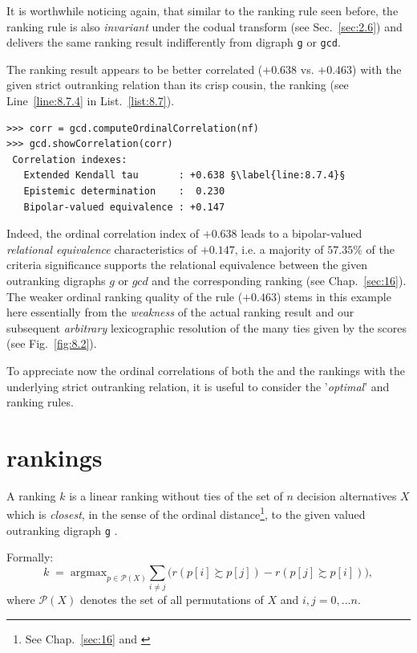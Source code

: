 It is worthwhile noticing again, that similar to the \Copeland ranking rule seen before, the \NetFlows ranking rule is also \emph{invariant} under the codual transform (see Sec.~\ref{sec:2.6}) and delivers the same ranking result indifferently from digraph \texttt{g} or \texttt{gcd}. 

The \NetFlows ranking result appears to be better correlated ($+0.638$ vs. $+0.463$) with the given strict outranking relation than its crisp cousin, the \Copeland ranking (see Line~\ref{line:8.7.4} in List.~\vref{list:8.7}).
\begin{lstlisting}[caption={Checking the quality of the \NetFlows Ranking},label=list:8.7]   
>>> corr = gcd.computeOrdinalCorrelation(nf)
>>> gcd.showCorrelation(corr)
 Correlation indexes:
   Extended Kendall tau       : +0.638 §\label{line:8.7.4}§
   Epistemic determination    :  0.230
   Bipolar-valued equivalence : +0.147
\end{lstlisting}

Indeed, the ordinal correlation index of $+0.638$ leads to a bipolar-valued \emph{relational equivalence} characteristics of $+0.147$, i.e. a majority of $57.35\%$ of the criteria significance supports the relational equivalence between the given outranking digraphs $g$ or $gcd$  and the corresponding \NetFlows ranking (see Chap.~\ref{sec:16}). The weaker ordinal ranking quality of the \Copeland rule ($+0.463$) stems in this example here essentially from the \emph{weakness} of the actual \Copeland ranking result and our subsequent \emph{arbitrary} lexicographic resolution of the many ties given by the \Copeland scores (see Fig.~\vref{fig:8.2}).

To appreciate now the ordinal correlations of both the \Copeland and the \NetFlows rankings with the underlying strict outranking relation, it is useful to consider the '\emph{optimal}' \Kemeny and \Slater ranking rules.

\section{\Kemeny rankings}
\label{sec:8.4}

A \Kemeny ranking $k$ is a linear ranking without ties of the set of $n$ decision alternatives $X$ which is \emph{closest}, in the sense of the ordinal \Kendall distance\footnote{See Chap.~\ref{sec:16} and \citealp{BIS-2012a}}, to the given valued outranking digraph \texttt{g}  \citep{KEM-1959}.

Formally:
\begin{equation}\label{eq:8.1}
    k \;=\; \text{argmax}_{p \in \mathcal{P}(X)} \sum_{i \neq j}\big(r(p[i] \succsim p[j]) - r(p[j] \succsim p[i]) \big),
\end{equation}
where $\mathcal{P}(X)$ denotes the set of all permutations of $X$ and $i,j = 0,... n$.

